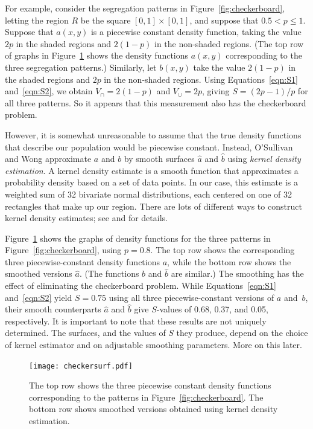 \documentclass{article}
\theoremstyle{theorem}
\theoremstyle{definition}
\begin{document}
For example, consider the segregation patterns in Figure~\ref{fig:checkerboard}, letting the region $R$ be the square $[0,1] \times [0,1]$, and suppose that $0.5 < p \leq 1$. Suppose that $a(x,y)$ is a piecewise constant density function, taking the value $2p$ in the shaded regions and $2(1-p)$ in the non-shaded regions. (The top row of graphs in Figure~\ref{fig:kdeexamples} shows the density functions $a(x,y)$ corresponding to the three segregation patterns.) Similarly, let $b(x,y)$ take the value $2(1-p)$ in the shaded regions and $2p$ in the non-shaded regions. Using Equations~\ref{eqn:S1} and~\ref{eqn:S2}, we obtain $V_\cap = 2(1-p)$ and $V_\cup = 2p$, giving $S = (2p-1)/p$ for all three patterns. So it appears that this measurement also has the checkerboard problem.

However, it is somewhat unreasonable to assume that the true density functions that describe our population would be piecewise constant. Instead, O'Sullivan and Wong approximate $a$ and $b$ by smooth surfaces $\hat{a}$ and $\hat{b}$ using \textit{kernel density estimation}. A kernel density estimate is a smooth function that approximates a probability density based on a set of data points. \cite{wandjones11} In our case, this estimate is a weighted sum of 32 bivariate normal distributions, each centered on one of 32 rectangles that make up our region. There are lots of different ways to construct kernel density estimates; see \cite{wandjones11} and \cite{dengwickham11} for details.

Figure~\ref{fig:kdeexamples} shows the graphs of density functions for the three patterns in Figure~\ref{fig:checkerboard}, using $p = 0.8$. The top row shows the corresponding three piecewise-constant density functions $a$, while the bottom row shows the smoothed versions $\hat{a}$. (The functions $b$ and $\hat{b}$ are similar.) The smoothing has the effect of eliminating the checkerboard problem. While Equations~\ref{eqn:S1} and~\ref{eqn:S2} yield $S = 0.75$ using all three piecewise-constant versions of $a$ and~$b$, their smooth counterparts $\hat{a}$ and $\hat{b}$ give $S$-values of 0.68, 0.37, and 0.05, respectively.
It is important to note that these results are not uniquely determined. The surfaces, and the values of $S$ they produce, depend on the choice of kernel estimator and on adjustable smoothing parameters. More on this later.

\begin{figure}[t!]
  \texttt{[image: checkersurf.pdf]} %
  \caption{The top row shows the three piecewise constant density functions corresponding to the patterns in Figure~\ref{fig:checkerboard}. The bottom row shows smoothed versions obtained using kernel density estimation.}
  \label{fig:kdeexamples}
\end{figure}
\end{document}
